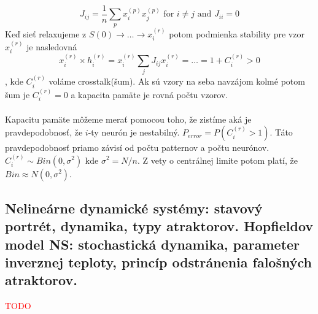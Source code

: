 \documentclass{article}
\numberwithin{equation}{section} %
\begin{document}
$$ J_{ij} = \frac{1}{n}\sum_p x_i^{(p)} x_j^{(p)} \text{ for } i\neq j \text{ and } J_{ii} = 0$$
Keď sieť relaxujeme z $S(0) \to \dots \to x_i^{(r)}$ potom podmienka stability  pre vzor $x_i^{(r)}$ je nasledovná 
$$x_i^{(r)}\times h_i^{(r)} = x_i^{(r)}\sum_jJ_{ij}x_i^{(r)} = \dots = 1 + C_i^{(r)} > 0$$, 
kde $C_i^{(r)}$ voláme crosstalk(šum). Ak sú vzory na seba navzájom kolmé potom šum je $C_i^{(r)} = 0$ a kapacita pamäte je rovná počtu vzorov.
\\\\
Kapacitu pamäte môžeme merať pomocou toho, že zistíme aká je pravdepodobnosť, že $i$-ty neurón je nestabilný. $P_{error} = P(C_i^{(r)} > 1)$. Táto pravdepodobnosť priamo závisí od počtu patternov a počtu neurónov. $C_i^{(r)} \sim Bin(0,\sigma^2)$ kde $\sigma^2 = N/n$. Z vety o centrálnej limite potom platí, že $Bin\approx N(0, \sigma^2)$.


\subsection{Nelineárne dynamické systémy: stavový portrét, dynamika, typy atraktorov. Hopfieldov model NS: stochastická dynamika, parameter inverznej teploty, princíp odstránenia falošných atraktorov.}
\textcolor{red}{TODO}
\end{document}
